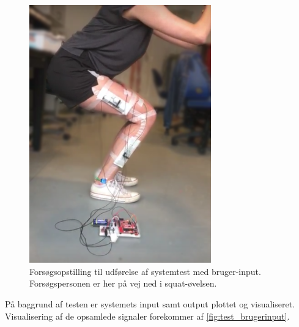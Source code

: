 \begin{figure}[H]
\centering
\includegraphics[width=0.7\textwidth]{figures/test_squat}
\caption{Forsøgsopstilling til udførelse af systemtest med bruger-input. Forsøgspersonen er her på vej ned i squat-øvelsen.}
\label{fig:test_squat}
\end{figure}

\noindent
På baggrund af testen er systemets input samt output plottet og visualiseret. Visualisering af de opsamlede signaler forekommer af \autoref{fig:test_brugerinput}. 


